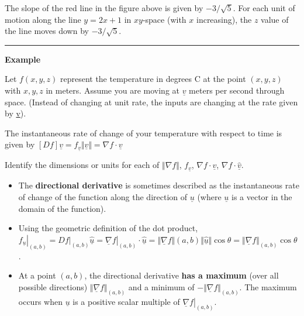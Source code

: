 \documentclass[12pt,letterpaper,noanswers]{exam}
\newcommand{\mb}[1]{\underline{#1}}
\begin{document}
The slope of the red line in the figure above is given by $-3/\sqrt{5}$.  For each unit of motion along the line $y = 2x+1$ in $xy$-space (with $x$ increasing), the $z$ value of the line moves down by $-3/\sqrt{5}$.


\vspace{0.2cm}
\hrule
\vspace{0.2cm}

\noindent\textbf{Example}

 Let $f(x,y,z)$ represent the temperature in degrees C at the point $(x,y,z)$ with $x,y,z$ in meters.  Assume you are moving at $\mb{v}$ meters per second through space.  (Instead of changing at unit rate, the inputs are changing at the rate given by \mb{v}).

The instantaneous rate of change of your temperature with respect to time is given by $[Df] \mb{v} = f_{\mb{v}}\Vert \mb{v}\Vert = \nabla f\cdot \mb v$

Identify the dimensions or units for each of $\Vert \nabla f\Vert$, $f_{\mb{v}}$, $\nabla f\cdot \mb{v}$, $\nabla f\cdot \hat{\mb{v}}$.
\vspace{1in}




\begin{tcolorbox}
\begin{itemize}
    \item The \textbf{directional derivative} is sometimes described as the instantaneous rate of change of the function along the direction of $\mb{u}$ (where $\mb{u}$ is a vector in the domain of the function).
    \item Using the geometric definition of the dot product, $\left.f_{\mb{ u}}\right\vert_{(a,b)} = \left.Df\right\vert_{(a,b)}\hat{\mb{u}} = \left.\mb{\nabla}f\right\vert_{(a,b)}\cdot \hat{\mb{u}} = \Vert \mb{\nabla}f\Vert{(a,b)}\Vert\hat{\mb{u}}\Vert\cos\theta = \Vert \mb{\nabla}f\Vert_{(a,b)}\cos\theta$.
    \item At a point $(a,b)$, the directional derivative \textbf{has a maximum} (over all possible directions) $\Vert \mb{\nabla}f\Vert_{(a,b)}$ and a minimum of $-\Vert \mb{\nabla}f\Vert_{(a,b)}$.  The maximum occurs when $\mb{u}$ is a positive scalar multiple of $ \left.\mb{\nabla}f\right\vert_{(a,b)}$.
\end{itemize}
\end{tcolorbox}
\end{document}
